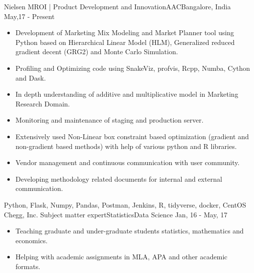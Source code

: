 %
%
%
\begin{experiences}
  \experience
    {Nielsen}   {MROI | Product Development and Innovation}{AAC}{Bangalore, India}
    {May,17 - Present} {
                      \begin{itemize}
                        \item Development of Marketing Mix Modeling and Market Planner tool using Python based on Hierarchical Linear Model (HLM), Generalized reduced gradient decent (GRG2) and Monte Carlo Simulation. 
                        \item Profiling and Optimizing code using SnakeViz, profvis, Rcpp, Numba, Cython and Dask.
                        \item In depth understanding of additive and multiplicative model in Marketing Research Domain.
                        \item Monitoring and maintenance of staging and production server.
                        \item Extensively used Non-Linear box constraint based optimization (gradient and non-gradient based methods) with help of various python and R libraries.
                        \item Vendor management and continuous communication with user community.
                        \item Developing methodology related documents for internal and external communication.
                        \end{itemize}
                    }
                    {Python, Flask, Numpy, Pandas, Postman, Jenkins, R, tidyverse, docker, CentOS}
  \emptySeparator
  \experience
    {Chegg, Inc.} {Subject matter expert}{Statistics}{Data Science}
    {Jan, 16 - May, 17}    {
                      \begin{itemize}
                        \item Teaching graduate and under-graduate students statistics, mathematics and economics.                           
                        \item Helping with academic assignments in MLA, APA and other academic formats.                       

\end{itemize}}
\end{experiences}
